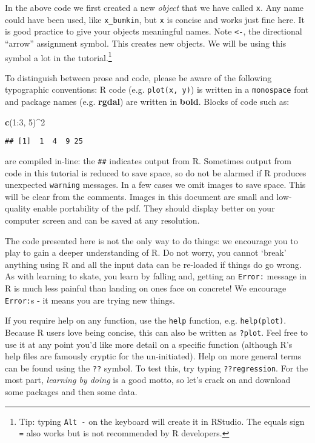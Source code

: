 \documentclass[]{article}
\newenvironment{Shaded}{}{}
\newcommand{\KeywordTok}[1]{\textcolor[rgb]{0.00,0.44,0.13}{\textbf{{#1}}}}
\newcommand{\DecValTok}[1]{\textcolor[rgb]{0.25,0.63,0.44}{{#1}}}
\newcommand{\NormalTok}[1]{{#1}}
\begin{document}
In the above code we first created a new \emph{object} that we have
called \texttt{x}. Any name could have been used, like
\texttt{x\_bumkin}, but \texttt{x} is concise and works just fine here.
It is good practice to give your objects meaningful names. Note
\texttt{\textless{}-}, the directional ``arrow'' assignment symbol. This
creates new objects. We will be using this symbol a lot in the
tutorial.\footnote{Tip: typing \texttt{Alt -} on the keyboard will
  create it in RStudio. The equals sign \texttt{=} also works but is not
  recommended by R developers.}

To distinguish between prose and code, please be aware of the following
typographic conventions: R code (e.g. \texttt{plot(x, y)}) is written in
a \texttt{monospace} font and package names (e.g. \textbf{rgdal}) are
written in \textbf{bold}. Blocks of code such as:

\begin{Shaded}
\begin{Highlighting}[]
\KeywordTok{c}\NormalTok{(}\DecValTok{1}\NormalTok{:}\DecValTok{3}\NormalTok{, }\DecValTok{5}\NormalTok{)^}\DecValTok{2}
\end{Highlighting}
\end{Shaded}

\begin{verbatim}
## [1]  1  4  9 25
\end{verbatim}

are compiled in-line: the \texttt{\#\#} indicates output from R.
Sometimes output from code in this tutorial is reduced to save space, so
do not be alarmed if R produces unexpected \texttt{warning} messages. In
a few cases we omit images to save space. This will be clear from the
comments. Images in this document are small and low-quality enable
portability of the pdf. They should display better on your computer
screen and can be saved at any resolution.

The code presented here is not the only way to do things: we encourage
you to play to gain a deeper understanding of R. Do not worry, you
cannot `break' anything using R and all the input data can be re-loaded
if things do go wrong. As with learning to skate, you learn by falling
and, getting an \texttt{Error:} message in R is much less painful than
landing on ones face on concrete! We encourage \texttt{Error:}s - it
means you are trying new things.

If you require help on any function, use the \texttt{help} function,
e.g. \texttt{help(plot)}. Because R users love being concise, this can
also be written as \texttt{?plot}. Feel free to use it at any point
you'd like more detail on a specific function (although R's help files
are famously cryptic for the un-initiated). Help on more general terms
can be found using the \texttt{??} symbol. To test this, try typing
\texttt{??regression}. For the most part, \emph{learning by doing} is a
good motto, so let's crack on and download some packages and then some
data.
\end{document}
